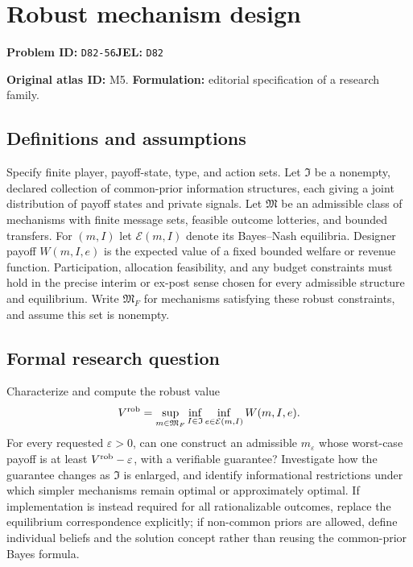 \documentclass[11pt,a4paper]{article}
\begin{document}
\section*{Robust mechanism design}
\textbf{Problem ID:} \texttt{D82-56}\quad \textbf{JEL:} \texttt{D82}\par
\label{problem:OP-0005}
\label{atlas:prob:M5}

\noindent\textbf{Original atlas ID:} M5. \textbf{Formulation:} editorial specification of a research family.

\subsection*{Definitions and assumptions}

Specify finite player, payoff-state, type, and action sets. Let $\mathfrak I$ be a nonempty, declared collection of common-prior information structures, each giving a joint distribution of payoff states and private signals. Let $\mathfrak M$ be an admissible class of mechanisms with finite message sets, feasible outcome lotteries, and bounded transfers. For $(m,I)$ let $\mathcal E(m,I)$ denote its Bayes--Nash equilibria. Designer payoff $W(m,I,e)$ is the expected value of a fixed bounded welfare or revenue function. Participation, allocation feasibility, and any budget constraints must hold in the precise interim or ex-post sense chosen for every admissible structure and equilibrium. Write $\mathfrak M_F$ for mechanisms satisfying these robust constraints, and assume this set is nonempty.

\subsection*{Formal research question}

Characterize and compute the robust value
\[
V^{\rm rob}=\sup_{m\in\mathfrak M_F}\inf_{I\in\mathfrak I}\inf_{e\in\mathcal E(m,I)}W(m,I,e).
\]
For every requested $\varepsilon>0$, can one construct an admissible $m_\varepsilon$ whose worst-case payoff is at least $V^{\rm rob}-\varepsilon$, with a verifiable guarantee? Investigate how the guarantee changes as $\mathfrak I$ is enlarged, and identify informational restrictions under which simpler mechanisms remain optimal or approximately optimal. If implementation is instead required for all rationalizable outcomes, replace the equilibrium correspondence explicitly; if non-common priors are allowed, define individual beliefs and the solution concept rather than reusing the common-prior Bayes formula.
\end{document}
